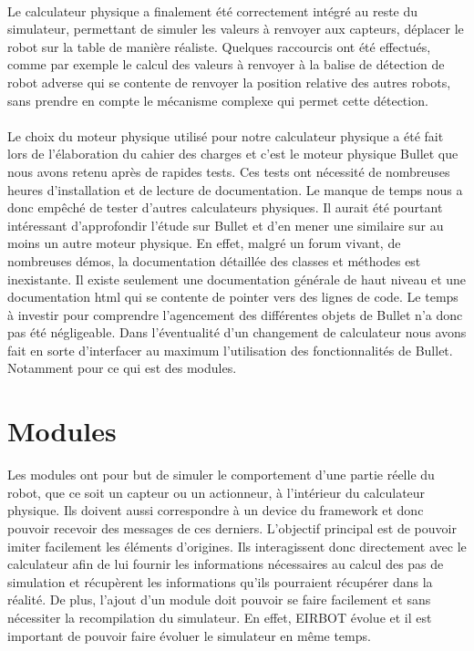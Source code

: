\paragraph{}

Le calculateur physique a finalement été correctement intégré au reste du simulateur, permettant de simuler les valeurs à renvoyer aux capteurs, déplacer le robot sur la table de manière réaliste. Quelques raccourcis ont été effectués, comme par exemple le calcul des valeurs à renvoyer à la balise de détection de robot adverse qui se contente de renvoyer la position relative des autres robots, sans prendre en compte le mécanisme complexe qui permet cette détection.

\paragraph{}

Le choix du moteur physique utilisé pour notre calculateur physique a été fait lors de l'élaboration du cahier des charges et c'est le moteur physique Bullet que nous avons retenu après de rapides tests. Ces tests ont nécessité de nombreuses heures d'installation et de lecture de documentation. Le manque de temps nous a donc empêché de tester d'autres calculateurs physiques. Il aurait été pourtant intéressant d'approfondir l'étude sur Bullet et d'en mener une similaire sur au moins un autre moteur physique. En effet, malgré un forum vivant, de nombreuses démos, la documentation détaillée des classes et méthodes est inexistante. Il existe seulement une documentation générale de haut niveau et une documentation html qui se contente de pointer vers des lignes de code. Le temps à investir pour comprendre l'agencement des différentes objets de Bullet n'a donc pas été négligeable. Dans l'éventualité d'un changement de calculateur nous avons fait en sorte d'interfacer au maximum l'utilisation des fonctionnalités de Bullet. Notamment pour ce qui est des modules.


\section{Modules}

Les modules ont pour but de simuler le comportement d'une partie réelle du robot, que ce soit un capteur ou un actionneur, à l'intérieur du calculateur physique. Ils doivent aussi correspondre à un device du framework et donc pouvoir recevoir des messages de ces derniers. L'objectif principal est de pouvoir imiter facilement les éléments d'origines. Ils interagissent donc directement avec le calculateur afin de lui fournir les informations nécessaires au calcul des pas de simulation et récupèrent les informations qu'ils pourraient récupérer dans la réalité. De plus, l'ajout d'un module doit pouvoir se faire facilement et sans nécessiter la recompilation du simulateur. En effet, EIRBOT évolue et il est important de pouvoir faire évoluer le simulateur en même temps.

